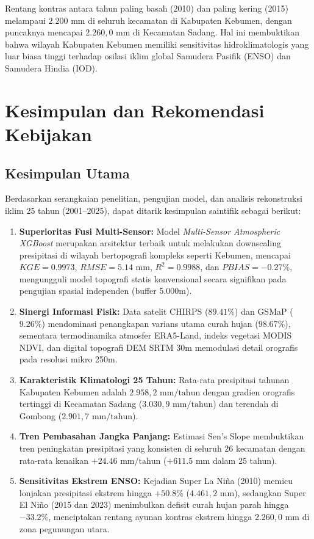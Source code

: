 \documentclass[11pt,a4paper,titlepage]{article}
\begin{document}
Rentang kontras antara tahun paling basah (2010) dan paling kering (2015) melampaui $2.200\text{ mm}$ di seluruh kecamatan di Kabupaten Kebumen, dengan puncaknya mencapai $2.260,0\text{ mm}$ di Kecamatan Sadang. Hal ini membuktikan bahwa wilayah Kabupaten Kebumen memiliki sensitivitas hidroklimatologis yang luar biasa tinggi terhadap osilasi iklim global Samudera Pasifik (ENSO) dan Samudera Hindia (IOD).

\section{Kesimpulan dan Rekomendasi Kebijakan}

\subsection{Kesimpulan Utama}
Berdasarkan serangkaian penelitian, pengujian model, dan analisis rekonstruksi iklim 25 tahun (2001--2025), dapat ditarik kesimpulan saintifik sebagai berikut:
\begin{enumerate}
    \item \textbf{Superioritas Fusi Multi-Sensor:} Model \textit{Multi-Sensor Atmospheric XGBoost} merupakan arsitektur terbaik untuk melakukan downscaling presipitasi di wilayah bertopografi kompleks seperti Kebumen, mencapai $KGE = 0.9973$, $RMSE = 5.14\text{ mm}$, $R^2 = 0.9988$, dan $PBIAS = -0.27\%$, mengungguli model topografi statis konvensional secara signifikan pada pengujian spasial independen (buffer 5.000m).
    \item \textbf{Sinergi Informasi Fisik:} Data satelit CHIRPS ($89.41\%$) dan GSMaP ($9.26\%$) mendominasi penangkapan varians utama curah hujan ($98.67\%$), sementara termodinamika atmosfer ERA5-Land, indeks vegetasi MODIS NDVI, dan digital topografi DEM SRTM 30m memodulasi detail orografis pada resolusi mikro 250m.
    \item \textbf{Karakteristik Klimatologi 25 Tahun:} Rata-rata presipitasi tahunan Kabupaten Kebumen adalah $2.958,2\text{ mm/tahun}$ dengan gradien orografis tertinggi di Kecamatan Sadang ($3.030,9\text{ mm/tahun}$) dan terendah di Gombong ($2.901,7\text{ mm/tahun}$).
    \item \textbf{Tren Pembasahan Jangka Panjang:} Estimasi Sen's Slope membuktikan tren peningkatan presipitasi yang konsisten di seluruh 26 kecamatan dengan rata-rata kenaikan $+24.46\text{ mm/tahun}$ ($+611.5\text{ mm}$ dalam 25 tahun).
    \item \textbf{Sensitivitas Ekstrem ENSO:} Kejadian Super La Niña (2010) memicu lonjakan presipitasi ekstrem hingga $+50.8\%$ ($4.461,2\text{ mm}$), sedangkan Super El Niño (2015 dan 2023) menimbulkan defisit curah hujan parah hingga $-33.2\%$, menciptakan rentang ayunan kontras ekstrem hingga $2.260,0\text{ mm}$ di zona pegunungan utara.
\end{enumerate}
\end{document}
